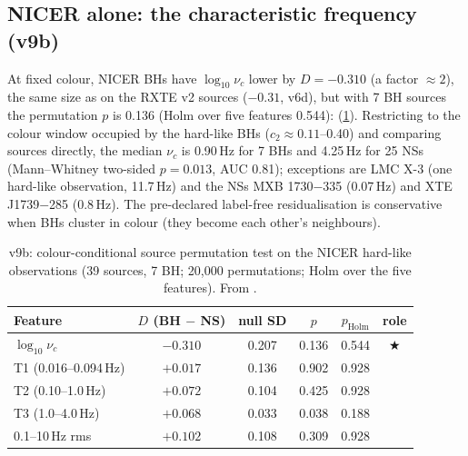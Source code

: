 \subsection{NICER alone: the characteristic frequency (v9b)}\label{sec:p5v9b}
\Primary{} At fixed colour, NICER BHs have $\log_{10}\nu_c$ lower by $D=-0.310$ (a factor $\approx2$), the same size as on the RXTE v2
sources ($-0.31$, v6d), but with 7 BH sources the permutation $p$ is 0.136 (Holm over five features 0.544): \NotDetected{}
(\cref{tab:p5v9b}). \PostHoc{} Restricting to the colour window occupied by the hard-like BHs ($c_2\approx0.11$--0.40) and comparing
sources directly, the median $\nu_c$ is 0.90\,Hz for 7 BHs and 4.25\,Hz for 25 NSs (Mann--Whitney two-sided $p=0.013$, AUC 0.81);
exceptions are LMC X-3 (one hard-like observation, 11.7\,Hz) and the NSs MXB 1730$-$335 (0.07\,Hz) and XTE J1739$-$285 (0.8\,Hz).
The pre-declared label-free residualisation is conservative when BHs cluster in colour (they become each other's neighbours).

\begin{table}[htbp]
\centering\small
\caption[NICER characteristic frequency test]{\Primary{} v9b: colour-conditional source permutation test on the NICER hard-like
observations (39 sources, 7 BH; 20,000 permutations; Holm over the five features). From
.}
\label{tab:p5v9b}
\begin{tabular}{@{}lccccc@{}}
\toprule
Feature & $D$ (BH $-$ NS) & null SD & $p$ & $p_\mathrm{Holm}$ & role \\
\midrule
$\log_{10}\nu_c$ & $-0.310$ & 0.207 & 0.136 & 0.544 & $\bigstar$ \\
T1 (0.016--0.094\,Hz) & $+0.017$ & 0.136 & 0.902 & 0.928 & \\
T2 (0.10--1.0\,Hz) & $+0.072$ & 0.104 & 0.425 & 0.928 & \\
T3 (1.0--4.0\,Hz) & $+0.068$ & 0.033 & 0.038 & 0.188 & \\
0.1--10\,Hz rms & $+0.102$ & 0.108 & 0.309 & 0.928 & \\
\bottomrule
\end{tabular}
\end{table}

